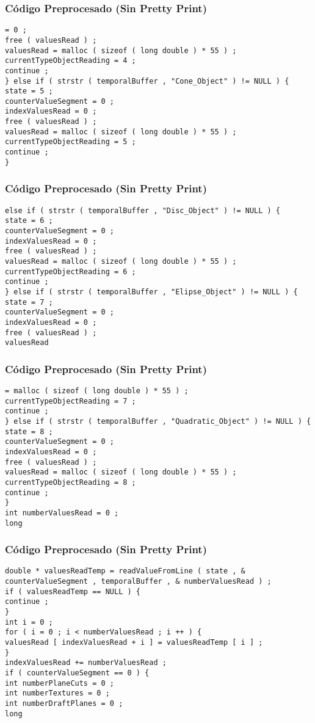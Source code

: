 \documentclass{beamer}
\begin{document}
\begin{frame}[fragile]
\frametitle{C\'odigo Preprocesado (Sin Pretty Print)}
\begin{lstlisting}[style=CStyle]
= 0 ; 
free ( valuesRead ) ; 
valuesRead = malloc ( sizeof ( long double ) * 55 ) ; 
currentTypeObjectReading = 4 ; 
continue ; 
} else if ( strstr ( temporalBuffer , "Cone_Object" ) != NULL ) { 
state = 5 ; 
counterValueSegment = 0 ; 
indexValuesRead = 0 ; 
free ( valuesRead ) ; 
valuesRead = malloc ( sizeof ( long double ) * 55 ) ; 
currentTypeObjectReading = 5 ; 
continue ; 
} \end{lstlisting}
\end{frame}
\begin{frame}[fragile]
\frametitle{C\'odigo Preprocesado (Sin Pretty Print)}
\begin{lstlisting}[style=CStyle]
else if ( strstr ( temporalBuffer , "Disc_Object" ) != NULL ) { 
state = 6 ; 
counterValueSegment = 0 ; 
indexValuesRead = 0 ; 
free ( valuesRead ) ; 
valuesRead = malloc ( sizeof ( long double ) * 55 ) ; 
currentTypeObjectReading = 6 ; 
continue ; 
} else if ( strstr ( temporalBuffer , "Elipse_Object" ) != NULL ) { 
state = 7 ; 
counterValueSegment = 0 ; 
indexValuesRead = 0 ; 
free ( valuesRead ) ; 
valuesRead \end{lstlisting}
\end{frame}
\begin{frame}[fragile]
\frametitle{C\'odigo Preprocesado (Sin Pretty Print)}
\begin{lstlisting}[style=CStyle]
= malloc ( sizeof ( long double ) * 55 ) ; 
currentTypeObjectReading = 7 ; 
continue ; 
} else if ( strstr ( temporalBuffer , "Quadratic_Object" ) != NULL ) { 
state = 8 ; 
counterValueSegment = 0 ; 
indexValuesRead = 0 ; 
free ( valuesRead ) ; 
valuesRead = malloc ( sizeof ( long double ) * 55 ) ; 
currentTypeObjectReading = 8 ; 
continue ; 
} 
int numberValuesRead = 0 ; 
long \end{lstlisting}
\end{frame}
\begin{frame}[fragile]
\frametitle{C\'odigo Preprocesado (Sin Pretty Print)}
\begin{lstlisting}[style=CStyle]
double * valuesReadTemp = readValueFromLine ( state , & counterValueSegment , temporalBuffer , & numberValuesRead ) ; 
if ( valuesReadTemp == NULL ) { 
continue ; 
} 
int i = 0 ; 
for ( i = 0 ; i < numberValuesRead ; i ++ ) { 
valuesRead [ indexValuesRead + i ] = valuesReadTemp [ i ] ; 
} 
indexValuesRead += numberValuesRead ; 
if ( counterValueSegment == 0 ) { 
int numberPlaneCuts = 0 ; 
int numberTextures = 0 ; 
int numberDraftPlanes = 0 ; 
long \end{lstlisting}
\end{frame}
\end{document}
